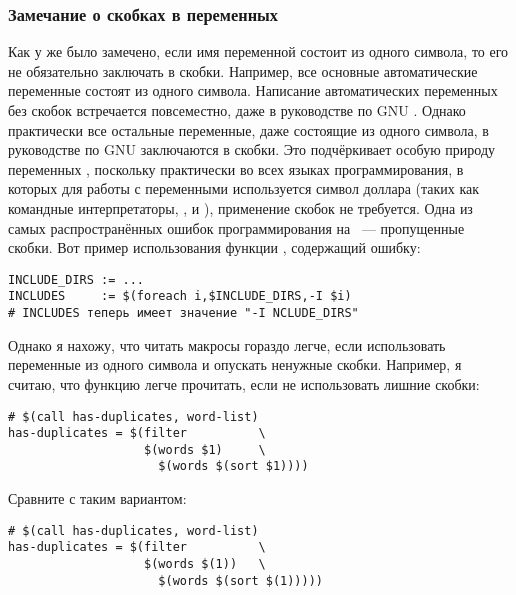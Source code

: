 \subsubsection*{Замечание о скобках в переменных}

Как у же было замечено, если имя переменной \GNUmake{} состоит из
одного символа, то его не обязательно заключать в скобки. Например,
все основные автоматические переменные состоят из одного символа.
Написание автоматических переменных без скобок встречается
повсеместно, даже в руководстве по GNU \GNUmake{}. Однако практически
все остальные переменные, даже состоящие из одного символа, в
руководстве по GNU \GNUmake{} заключаются в скобки.  Это подчёркивает
особую природу переменных \GNUmake{}, поскольку практически во всех
языках программирования, в которых для работы с переменными
используется символ доллара (таких как командные интерпретаторы,
,  и ), применение скобок не
требуется. Одна из самых распространённых ошибок программирования на
\GNUmake{}~--- пропущенные скобки. Вот пример использования функции
, содержащий ошибку:

{\footnotesize
\begin{verbatim}
INCLUDE_DIRS := ...
INCLUDES     := $(foreach i,$INCLUDE_DIRS,-I $i)
# INCLUDES теперь имеет значение "-I NCLUDE_DIRS"
\end{verbatim}
}

Однако я нахожу, что читать макросы гораздо легче, если использовать
переменные из одного символа и опускать ненужные скобки. Например, я
считаю, что функцию  легче прочитать, если не
использовать лишние скобки:

{\footnotesize
\begin{verbatim}
# $(call has-duplicates, word-list)
has-duplicates = $(filter          \
                   $(words $1)     \
                     $(words $(sort $1))))
\end{verbatim}
}

Сравните с таким вариантом:

{\footnotesize
\begin{verbatim}
# $(call has-duplicates, word-list)
has-duplicates = $(filter          \
                   $(words $(1))   \
                     $(words $(sort $(1)))))
\end{verbatim}
}

